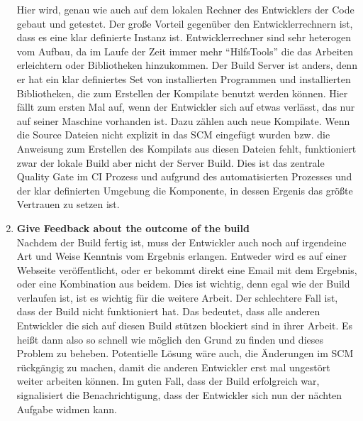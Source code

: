 \begin{enumerate}
		Hier wird, genau wie auch auf dem lokalen Rechner des Entwicklers der Code gebaut und getestet. Der große Vorteil gegenüber den Entwicklerrechnern ist, dass es eine klar definierte Instanz ist. Entwicklerrechner sind sehr heterogen vom Aufbau, da im Laufe der Zeit immer mehr "`HilfsTools"' die das Arbeiten erleichtern oder Bibliotheken hinzukommen. Der Build Server ist anders, denn er hat ein klar definiertes Set von installierten Programmen und installierten Bibliotheken, die zum Erstellen der Kompilate benutzt werden können. Hier fällt zum ersten Mal auf, wenn der Entwickler sich auf etwas verlässt, das nur auf seiner Maschine vorhanden ist. Dazu zählen auch neue Kompilate. Wenn die Source Dateien nicht explizit in das SCM eingefügt wurden bzw. die Anweisung zum Erstellen des Kompilats aus diesen Dateien fehlt, funktioniert zwar der lokale Build aber nicht der Server Build. Dies ist das zentrale Quality Gate im CI Prozess und aufgrund des automatisierten Prozesses und der klar definierten Umgebung die Komponente, in dessen Ergenis das größte Vertrauen zu setzen ist.
		\item \textbf{Give Feedback about the outcome of the build}\\%
		Nachdem der Build fertig ist, muss der Entwickler auch noch auf irgendeine Art und Weise Kenntnis vom Ergebnis erlangen. Entweder wird es auf einer Webseite veröffentlicht, oder er bekommt direkt eine Email mit dem Ergebnis, oder eine Kombination aus beidem. Dies ist wichtig, denn egal wie der Build verlaufen ist, ist es wichtig für die weitere Arbeit. Der schlechtere Fall ist, dass der Build nicht funktioniert hat. Das bedeutet, dass alle anderen Entwickler die sich auf diesen Build stützen blockiert sind in ihrer Arbeit. Es heißt dann also so schnell wie möglich den Grund zu finden und dieses Problem zu beheben. Potentielle Lösung wäre auch, die Änderungen im SCM rückgängig zu machen, damit die anderen Entwickler erst mal ungestört weiter arbeiten können. Im guten Fall, dass der Build erfolgreich war, signalisiert die Benachrichtigung, dass der Entwickler sich nun der nächten Aufgabe widmen kann.
\end{enumerate}
